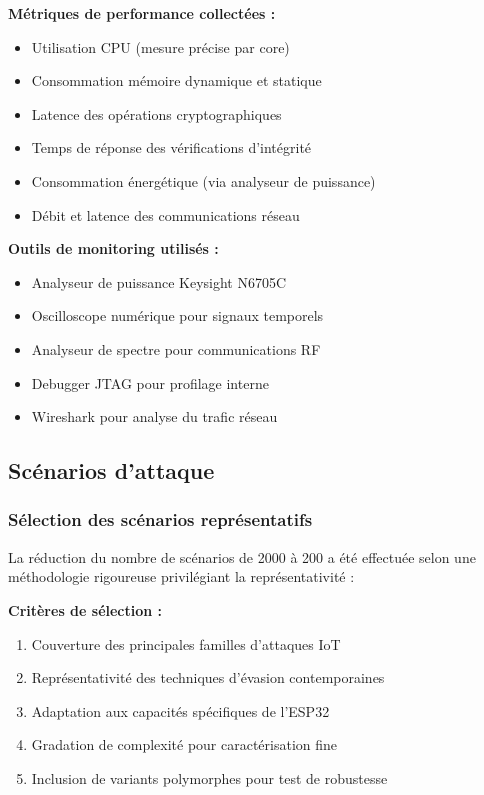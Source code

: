 \textbf{Métriques de performance collectées :}
\begin{itemize}
    \item Utilisation CPU (mesure précise par core)
    \item Consommation mémoire dynamique et statique
    \item Latence des opérations cryptographiques
    \item Temps de réponse des vérifications d'intégrité
    \item Consommation énergétique (via analyseur de puissance)
    \item Débit et latence des communications réseau
\end{itemize}

\textbf{Outils de monitoring utilisés :}
\begin{itemize}
    \item Analyseur de puissance Keysight N6705C
    \item Oscilloscope numérique pour signaux temporels
    \item Analyseur de spectre pour communications RF
    \item Debugger JTAG pour profilage interne
    \item Wireshark pour analyse du trafic réseau
\end{itemize}

\subsection{Scénarios d'attaque}

\subsubsection{Sélection des scénarios représentatifs}

La réduction du nombre de scénarios de 2000 à 200 a été effectuée selon une méthodologie rigoureuse privilégiant la représentativité :

\textbf{Critères de sélection :}
\begin{enumerate}
    \item Couverture des principales familles d'attaques IoT
    \item Représentativité des techniques d'évasion contemporaines
    \item Adaptation aux capacités spécifiques de l'ESP32
    \item Gradation de complexité pour caractérisation fine
    \item Inclusion de variants polymorphes pour test de robustesse
\end{enumerate}

